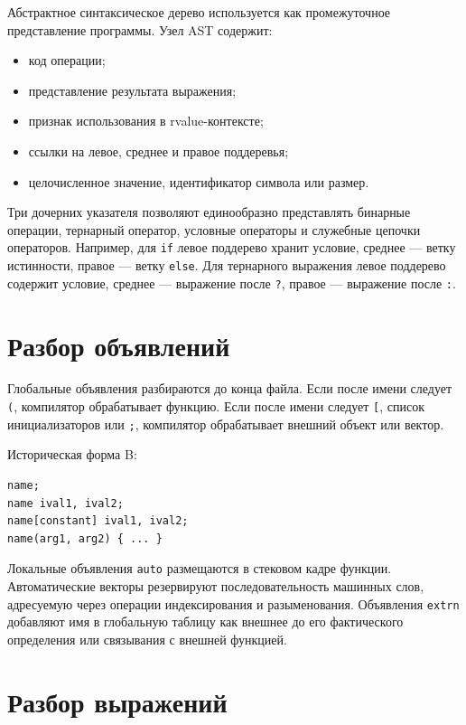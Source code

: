 Абстрактное синтаксическое дерево используется как промежуточное представление программы. Узел AST содержит:

\begin{itemize}
  \item код операции;
  \item представление результата выражения;
  \item признак использования в rvalue-контексте;
  \item ссылки на левое, среднее и правое поддеревья;
  \item целочисленное значение, идентификатор символа или размер.
\end{itemize}

Три дочерних указателя позволяют единообразно представлять бинарные операции, тернарный оператор, условные операторы и служебные цепочки операторов. Например, для \texttt{if} левое поддерево хранит условие, среднее --- ветку истинности, правое --- ветку \texttt{else}. Для тернарного выражения левое поддерево содержит условие, среднее --- выражение после \texttt{?}, правое --- выражение после \texttt{:}.

\section{Разбор объявлений}

Глобальные объявления разбираются до конца файла. Если после имени следует \texttt{(}, компилятор обрабатывает функцию. Если после имени следует \texttt{[}, список инициализаторов или \texttt{;}, компилятор обрабатывает внешний объект или вектор.

Историческая форма B:

\begin{verbatim}
name;
name ival1, ival2;
name[constant] ival1, ival2;
name(arg1, arg2) { ... }
\end{verbatim}

Локальные объявления \texttt{auto} размещаются в стековом кадре функции. Автоматические векторы резервируют последовательность машинных слов, адресуемую через операции индексирования и разыменования. Объявления \texttt{extrn} добавляют имя в глобальную таблицу как внешнее до его фактического определения или связывания с внешней функцией.

\section{Разбор выражений}

